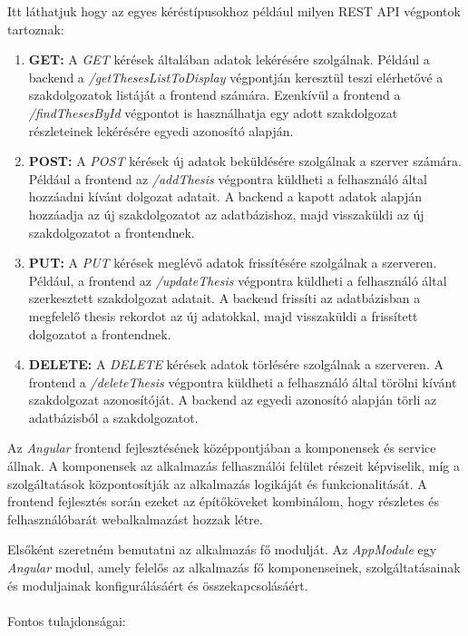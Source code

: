 Itt láthatjuk hogy az egyes kéréstípusokhoz például milyen REST API végpontok tartoznak:

\begin{enumerate}

\item{\textbf{GET:}}
A \textit{GET} kérések általában adatok lekérésére szolgálnak. Például a backend a \textit{/getThesesListToDisplay} végpontján keresztül teszi elérhetővé a szakdolgozatok listáját a frontend számára. Ezenkívül a frontend a \textit{/findThesesById} végpontot is használhatja egy adott szakdolgozat részleteinek lekérésére egyedi azonosító alapján.

\item{\textbf{POST:}}
A \textit{POST} kérések új adatok beküldésére szolgálnak a szerver számára. Például a frontend az \textit{/addThesis} végpontra küldheti a felhasználó által hozzáadni kívánt dolgozat adatait. A backend a kapott adatok alapján hozzáadja az új szakdolgozatot az adatbázishoz, majd visszaküldi az új szakdolgozatot a frontendnek.

\item{\textbf{PUT:}}
A \textit{PUT} kérések meglévő adatok frissítésére szolgálnak a szerveren. Például, a frontend az \textit{/updateThesis} végpontra küldheti a felhasználó által szerkesztett szakdolgozat adatait. A backend frissíti az adatbázisban a megfelelő thesis rekordot az új adatokkal, majd visszaküldi a frissített dolgozatot a frontendnek.

\item{\textbf{DELETE:}}
A \textit{DELETE} kérések adatok törlésére szolgálnak a szerveren. A frontend a \textit{/deleteThesis} végpontra küldheti a felhasználó által törölni kívánt szakdolgozat azonosítóját. A backend az egyedi azonosító alapján törli az adatbázisból a szakdolgozatot.

\end{enumerate}



Az \textit{Angular} \cite{angular} frontend fejlesztésének középpontjában a komponensek és service állnak. A komponensek az alkalmazás felhasználói felület részeit képviselik, míg a szolgáltatások központosítják az alkalmazás logikáját és funkcionalitását. A frontend fejlesztés során ezeket az építőköveket kombinálom, hogy részletes és felhasználóbarát webalkalmazást hozzak létre.

Elsőként szeretném bemutatni az alkalmazás fő modulját. Az \textit{AppModule} egy \textit{Angular} modul, amely felelős az alkalmazás fő komponenseinek, szolgáltatásainak és moduljainak konfigurálásáért és összekapcsolásáért. \\
\\Fontos tulajdonságai:

